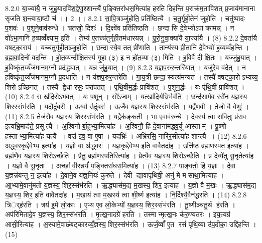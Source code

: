 8.2.0
या॒ज्या॑यै॒ न जु॑हु॒यादवि॑श॒द्वेणु॒श्शान्त्यै॑ प॒ङ्क्तिरा॑धस॒मित्या॑ह हरति दिहन्ति प॒राक्र॑म॒तावि॑शत् प्र॒जाय॑मानाना सृजति श॒न्त्वाया॒ष्टौ च॑ ।। 2 ।।
8.2.1
सा॒वि॒त्रञ्जु॑होति॒ प्रति॑ष्ठित्यै । च॒तु॒र्गृ॒ही॒तेन॑ जुहोति । चतु॑ष्पादः प॒शवः॑ । प॒शूने॒वाव॑रुन्धे । चत॑स्रो॒ दिशः॑ । दि॒क्ष्वे॑व प्रति॑तिष्ठति । छन्दासि दे॒वेभ्योऽपाक्रामन्न् । न वो॑ऽभा॒गानि॑ ह॒व्यव्वँ॑क्ष्याम॒ इति॑ । तेभ्य॑ ए॒तच्च॑तुर्गृही॒तम॑धारयन्न् । पु॒रो॒नु॒वा॒क्या॑यै या॒ज्या॑यै । (8)
8.2.2
दे॒वता॑यै वषट्का॒राय॑ । यच्च॑तुर्गृही॒तञ्जु॒होति॑ । छन्दास्ये॒व तत् प्री॑णाति । तान्य॑स्य प्री॒तानि॑ दे॒वेभ्यो॑ ह॒व्यव्वँ॑हन्ति । ब्र॒ह्म॒वा॒दिनो॑ वदन्ति । हो॒त॒व्य॑न्दीक्षि॒तस्य॑ गृ॒हा (३) इ न हो॑त॒व्या (३) मिति॑ । ह॒विर्वै दीक्षि॒तः । यज्जु॑हु॒यात् । ह॒विष्कृ॑त॒य्यँज॑मानम॒ग्नौ प्रद॑द्ध्यात् । यन्न जु॑हु॒यात् । (9)
8.2.3
य॒ज्ञ॒प॒रुर॒न्तरि॑यात् । यजु॑रे॒व व॑देत् । न ह॒विष्कृ॑त॒य्यँज॑मानम॒ग्नौ प्र॒दधा॑ति । न य॑ज्ञप॒रुर॒न्तरे॑ति । गा॒य॒त्री छन्दा॒स्यत्य॑मन्यत । तस्यै॑ वषट्का॒रोऽभ्यय्य॒ शिरोऽच्छिनत् । तस्यै द्वे॒धा रसः॒ परा॑पतत् । पृ॒थि॒वीम॒र्द्धः प्रावि॑शत् । प॒शून॒र्द्धः । यः पृ॑थि॒वीं प्रावि॑शत् । (10)
8.2.4
स ख॑दि॒रो॑ऽभवत् । यः प॒शून् । सो॑ऽजाम् । यत्खा॑दि॒र्यभ्रि॒र्भव॑ति । छन्द॑सामे॒व रसे॑न य॒ज्ञस्य॒ शिर॒स्संभ॑रति । यदौदुं॑बरी । ऊर्ग्वा उ॑दुं॒बरः॑ । ऊ॒र्जैव य॒ज्ञस्य॒ शिर॒स्संभ॑रति । यद्वै॑ण॒वी । तेजो॒ वै वेणुः॑ । (11)
8.2.5
तेज॑सै॒व य॒ज्ञस्य॒ शिर॒स्संभ॑रति । यद्वैक॑ङ्कती । भा ए॒वाव॑रुन्धे । दे॒वस्य॑ त्वा सवि॒तुः प्र॑स॒व इत्यभ्रि॒माद॑त्ते॒ प्रसूत्यै । अ॒श्विनोर्बा॒हुभ्या॒मित्या॑ह । अ॒श्विनौ॒ हि दे॒वाना॑मद्ध्व॒र्यू आस्ताम् । पू॒ष्णो हस्ताभ्या॒मित्या॑ह॒ यत्यै । वज्र॑ इव॒ वा ए॒षा । यदभ्रिः॑ । अभ्रि॑रसि॒ नारि॑र॒सीत्या॑ह॒ शान्त्यै । (12)
8.2.6
अ॒द्ध्व॒र॒कृद्दे॒वेभ्य॒ इत्या॑ह । य॒ज्ञो वा अ॑द्ध्व॒रः । य॒ज्ञ॒कृद्दे॒वेभ्य॒ इति॒ वावैतदा॑ह । उत्ति॑ष्ठ ब्रह्मणस्पत॒ इत्या॑ह । ब्रह्म॑णै॒व य॒ज्ञस्य॒ शिरोऽच्छै॑ति । प्रैतु॒ ब्रह्म॑ण॒स्पति॒रित्या॑ह । प्रेत्यै॒व य॒ज्ञस्य॒ शिरोऽच्छै॑ति । प्र दे॒व्ये॑तु सू॒नृतेत्या॑ह । य॒ज्ञो वै सू॒नृता । अच्छा॑ वी॒रन्नर्यं॑ प॒ङ्क्तिरा॑धस॒मित्या॑ह । (13)
8.2.7
पाङ्क्तो॒ हि य॒ज्ञः । दे॒वा य॒ज्ञन्न॑यन्तु न॒ इत्या॑ह । दे॒वाने॒व य॑ज्ञ॒नियः॑ कुरुते । देवी द्यावापृथिवी॒ अनु॑ मे मसाथा॒मित्या॑ह । आ॒भ्यामे॒वानु॑मतो य॒ज्ञस्य॒ शिर॒स्संभ॑रति । ऋ॒द्ध्यास॑म॒द्य म॒खस्य॒ शिर॒ इत्या॑ह । य॒ज्ञो वै म॒खः । ऋ॒द्ध्यास॑म॒द्य य॒ज्ञस्य॒ शिर॒ इति वावैतदा॑ह । म॒खाय॑ त्वा म॒खस्य॑ त्वा शी॒र्ष्ण इत्या॑ह । नि॒र्दिश्यै॒वैन॑द्धरति । (14)
8.2.8
त्रिर््ह॑रति । त्रय॑ इ॒मे लो॒काः । ए॒भ्य ए॒व लो॒केभ्यो॑ य॒ज्ञस्य॒ शिर॒स्संभ॑रति । तू॒ष्णीञ्च॑तु॒र्थ ह॑रति । अप॑रिमितादे॒व य॒ज्ञस्य॒ शिर॒स्संभ॑रति । मृ॒त्ख॒नादग्रे॑ हरति । तस्मान्मृत्ख॒नः क॑रु॒ण्य॑तरः । इय॒त्यग्र॑ आसी॒रित्या॑ह । अ॒स्यामे॒वाछं॑बट्कारय्यँ॒ज्ञस्य॒ शिर॒स्संभ॑रति । ऊर्जं॒व्वाँ ए॒त रसं॑ पृथि॒व्या उ॑प॒दीका॒ उद्दि॑हन्ति । (15)
